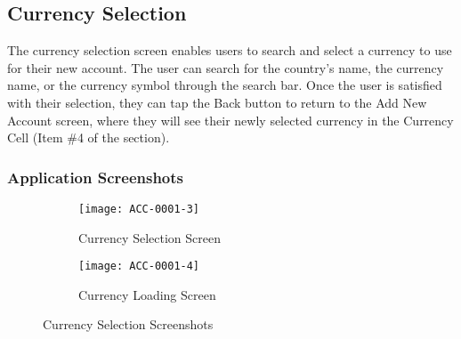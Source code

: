 
\subsection{Currency Selection}
\label{sec:add-account-currency}

The currency selection screen enables users to search and select a currency to use for their new account. The user can search for the country's name, the currency name, or the currency symbol through the search bar. Once the user is satisfied with their selection, they can tap the Back button to return to the Add New Account screen, where they will see their newly selected currency in the Currency Cell (Item \#4 of the  section).

\subsubsection{Application Screenshots}
\label{sec:add-account-currency-screenshots}

\begin{figure}[h]
 
\begin{subfigure}{0.5\textwidth}
  \texttt{[image: ACC-0001-3]} 
  \caption{Currency Selection Screen}
  \label{fig:currency-1}
\end{subfigure}
\begin{subfigure}{0.5\textwidth}
  \texttt{[image: ACC-0001-4]}
  \caption{Currency Loading Screen}
  \label{fig:currency-2}
\end{subfigure}
\caption{Currency Selection Screenshots}
\label{Currency Selection Screenshots}
\end{figure}

